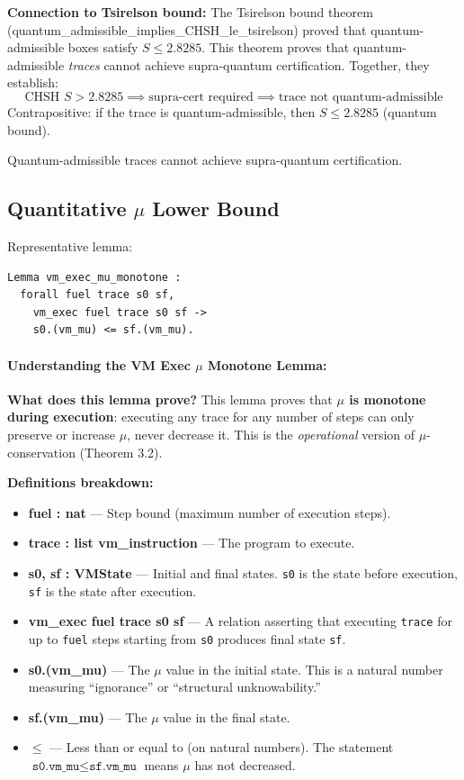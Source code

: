 \textbf{Connection to Tsirelson bound:} The Tsirelson bound theorem (quantum\_admissible\_implies\_CHSH\_le\_tsirelson) proved that quantum-admissible boxes satisfy $S \leq 2.8285$. This theorem proves that quantum-admissible \textit{traces} cannot achieve supra-quantum certification. Together, they establish:
\[
\text{CHSH } S > 2.8285 \implies \text{supra-cert required} \implies \text{trace not quantum-admissible}
\]
Contrapositive: if the trace is quantum-admissible, then $S \leq 2.8285$ (quantum bound).


Quantum-admissible traces cannot achieve supra-quantum certification.

\subsection{Quantitative $\mu$ Lower Bound}

Representative lemma:
\begin{lstlisting}
Lemma vm_exec_mu_monotone :
  forall fuel trace s0 sf,
    vm_exec fuel trace s0 sf ->
    s0.(vm_mu) <= sf.(vm_mu).
\end{lstlisting}

\paragraph{Understanding the VM Exec $\mu$ Monotone Lemma:}

\textbf{What does this lemma prove?} This lemma proves that \textbf{$\mu$ is monotone during execution}: executing any trace for any number of steps can only preserve or increase $\mu$, never decrease it. This is the \textit{operational} version of $\mu$-conservation (Theorem 3.2).

\textbf{Definitions breakdown:}
\begin{itemize}
    \item \textbf{fuel : nat} — Step bound (maximum number of execution steps).
    
    \item \textbf{trace : list vm\_instruction} — The program to execute.
    
    \item \textbf{s0, sf : VMState} — Initial and final states. \texttt{s0} is the state before execution, \texttt{sf} is the state after execution.
    
    \item \textbf{vm\_exec fuel trace s0 sf} — A relation asserting that executing \texttt{trace} for up to \texttt{fuel} steps starting from \texttt{s0} produces final state \texttt{sf}.
    
    \item \textbf{s0.(vm\_mu)} — The $\mu$ value in the initial state. This is a natural number measuring ``ignorance'' or ``structural unknowability.''
    
    \item \textbf{sf.(vm\_mu)} — The $\mu$ value in the final state.
    
    \item \textbf{$\leq$} — Less than or equal to (on natural numbers). The statement $\texttt{s0.vm\_mu} \leq \texttt{sf.vm\_mu}$ means $\mu$ has not decreased.
\end{itemize}

